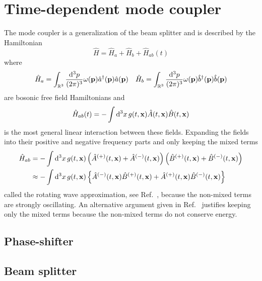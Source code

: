 \section{Time-dependent mode coupler}

The mode coupler is a generalization of the beam splitter and is described by the Hamiltonian
\begin{equation}
	\hat{H}
	=
	\hat{H}_a
	+
	\hat{H}_b
	+
	\hat{H}_{ab}(t)
\end{equation}
where
\begin{align}
	\hat{H}_a
	=
	\int_{\mathbb{R}^3}\frac{\dd[3]{p}}{(2\pi)^3}
	\omega(\vb{p})
	\hat{a}^\dagger(\vb{p})
	\hat{a}(\vb{p})
	&&
	\hat{H}_b
	=
	\int_{\mathbb{R}^3}\frac{\dd[3]{p}}{(2\pi)^3}
	\omega(\vb{p})
	\hat{b}^\dagger(\vb{p})
	\hat{b}(\vb{p})
\end{align}
are bosonic free field Hamiltonians and
\begin{equation}
	\hat{H}_{ab}(t)
	=
	-
	\int\dd[3]{x}
	g(t,\vb{x})
	\hat{A}(t,\vb{x})
	\hat{B}(t,\vb{x})
\end{equation}
is the most general linear interaction between these fields.
Expanding the fields into their positive and negative frequency parts and only keeping the mixed terms
\begin{equation}
	\begin{split}
		\hat{H}_{ab}
		&=
		-
		\int\dd[3]{x}
		g(t,\vb{x})
		\left(
			\hat{A}^{(+)}(t,\vb{x})
			+
			\hat{A}^{(-)}(t,\vb{x})
		\right)
		\left(
			\hat{B}^{(+)}(t,\vb{x})
			+
			\hat{B}^{(-)}(t,\vb{x})
		\right)
		\\
		&\approx
		-
		\int\dd[3]{x}
		g(t,\vb{x})
		\left\{
			\hat{A}^{(-)}(t,\vb{x})
			\hat{B}^{(+)}(t,\vb{x})
			+
			\hat{A}^{(+)}(t,\vb{x})
			\hat{B}^{(-)}(t,\vb{x})
		\right\}
	\end{split}
\end{equation}
called the rotating wave approximation, see Ref.~\cite[p.~158]{Gardiner2000}, because the non-mixed terms are strongly oscillating.
An alternative argument given in Ref.~\cite[p.~127]{Haroche2006} justifies keeping only the mixed terms because the non-mixed terms do not conserve energy.

\subsection{Phase-shifter}

\subsection{Beam splitter}